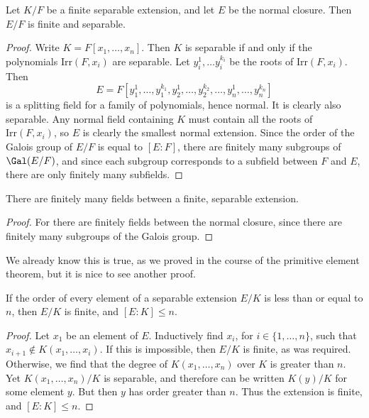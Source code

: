 \begin{prop}
    Let $K/F$ be a finite separable extension, and let $E$ be the normal closure. Then $E/F$ is finite and separable.
\end{prop}
\begin{proof}
    Write $K = F[x_1, \dots, x_n]$. Then $K$ is separable if and only if the polynomials $\text{Irr}(F,x_i)$ are separable. Let $y_i^1, \dots y_i^{k_i}$ be the roots of $\text{Irr}(F,x_i)$. Then
    \[ E = F[y_1^1, \dots, y_1^{k_1}, y_2^1, \dots, y_2^{k_2}, \dots, y_n^1, \dots, y_n^{k_n}] \]
    is a splitting field for a family of polynomials, hence normal. It is clearly also separable. Any normal field containing $K$ must contain all the roots of $\text{Irr}(F,x_i)$, so $E$ is clearly the smallest normal extension. Since the order of the Galois group of $E/F$ is equal to $[E:F]$, there are finitely many subgroups of $\Gal(E/F)$, and since each subgroup corresponds to a subfield between $F$ and $E$, there are only finitely many subfields.
\end{proof}

\begin{corollary}
    There are finitely many fields between a finite, separable extension.
\end{corollary}
\begin{proof}
    For there are finitely fields between the normal closure, since there are finitely many subgroups of the Galois group.
\end{proof}

We already know this is true, as we proved in the course of the primitive element theorem, but it is nice to see another proof.

\begin{lemma}
    If the order of every element of a separable extension $E/K$ is less than or equal to $n$, then $E/K$ is finite, and $[E:K] \leq n$.
\end{lemma}
\begin{proof}
    Let $x_1$ be an element of $E$. Inductively find $x_i$, for $i \in \{ 1, \dots, n \}$, such that $x_{i+1} \not \in K(x_1, \dots, x_i)$. If this is impossible, then $E/K$ is finite, as was required. Otherwise, we find that the degree of $K(x_1, \dots, x_n)$ over $K$ is greater than $n$. Yet $K(x_1, \dots, x_n)/K$ is separable, and therefore can be written $K(y)/K$ for some element $y$. But then $y$ has order greater than $n$. Thus the extension is finite, and $[E:K] \leq n$.
\end{proof}

